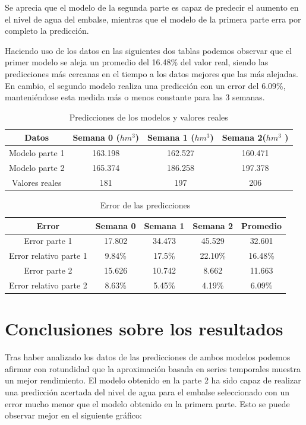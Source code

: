 \documentclass[12pt]{report} %
\begin{document}
Se aprecia que el modelo de la segunda parte es capaz de predecir el aumento en el nivel de agua del embalse, mientras que el modelo de la primera parte erra por completo la predicción.

Haciendo uso de los datos en las siguientes dos tablas podemos observar que el primer modelo se aleja un promedio del 16.48\% del valor real, siendo las predicciones más cercanas en el tiempo a los datos mejores que las más alejadas. En cambio, el segundo modelo realiza una predicción con un error del 6.09\%, manteniéndose esta medida más o menos constante para las 3 semanas.

\begin{table}[H]
    \begin{tabular}{|c|c|c|c|}
    \hline
    Datos & Semana 0 ($hm^3$) & Semana 1 ($hm^3$)& Semana 2($hm^3$ )\\
    \hline
    \hline
    Modelo parte 1 & 163.198 & 162.527 & 160.471\\
    Modelo parte 2 & 165.374 & 186.258 & 197.378\\
    Valores reales & 181     & 197     & 206    \\
    \hline
    \end{tabular}
    \caption {Predicciones de los modelos y valores reales}
\end{table}

\begin{table}[H]
\begin{tabular}{|c|c|c|c|c|}
    \hline
    Error & Semana 0 & Semana 1 & Semana 2 & Promedio\\
    \hline
    \hline
    Error parte 1  &  17.802 &  34.473 &  45.529 & 32.601\\
    Error relativo parte 1   & 9.84\% & 17.5\% & 22.10\% & 16.48\%\\
    Error parte 2  &  15.626 &  10.742 &   8.662 & 11.663\\
    Error relativo parte 2   & 8.63\% & 5.45\% & 4.19\% & 6.09\%\\ 
    \hline
    \end{tabular}
    \caption {Error de las predicciones}
\end{table}

\section{Conclusiones sobre los resultados}

Tras haber analizado los datos de las predicciones de ambos modelos podemos afirmar con rotundidad que la aproximación basada en series temporales muestra un mejor rendimiento. El modelo obtenido en la parte 2 ha sido capaz de realizar una predicción acertada del nivel de agua para el embalse seleccionado con un error mucho menor que el modelo obtenido en la primera parte. Esto se puede observar mejor en el siguiente gráfico:
\end{document}

